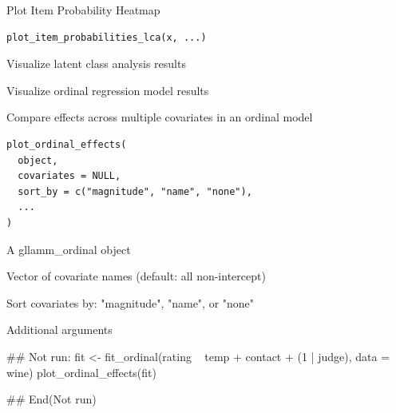 \documentclass[a4paper]{book}
\begin{document}
%
\begin{Description}
Plot Item Probability Heatmap
\end{Description}
%
\begin{Usage}
\begin{verbatim}
plot_item_probabilities_lca(x, ...)
\end{verbatim}
\end{Usage}
%
\begin{Description}
Visualize latent class analysis results
\end{Description}
%
\begin{Description}
Visualize ordinal regression model results
\end{Description}
%
\begin{Description}
Compare effects across multiple covariates in an ordinal model
\end{Description}
%
\begin{Usage}
\begin{verbatim}
plot_ordinal_effects(
  object,
  covariates = NULL,
  sort_by = c("magnitude", "name", "none"),
  ...
)
\end{verbatim}
\end{Usage}
%
\begin{Arguments}
\begin{ldescription}
\item[\code{object}] A gllamm\_ordinal object

\item[\code{covariates}] Vector of covariate names (default: all non-intercept)

\item[\code{sort\_by}] Sort covariates by: "magnitude", "name", or "none"

\item[\code{...}] Additional arguments
\end{ldescription}
\end{Arguments}
%
\begin{Examples}
\begin{ExampleCode}
## Not run: 
fit <- fit_ordinal(rating ~ temp + contact + (1 | judge), data = wine)
plot_ordinal_effects(fit)

## End(Not run)

\end{ExampleCode}
\end{Examples}
\end{document}
